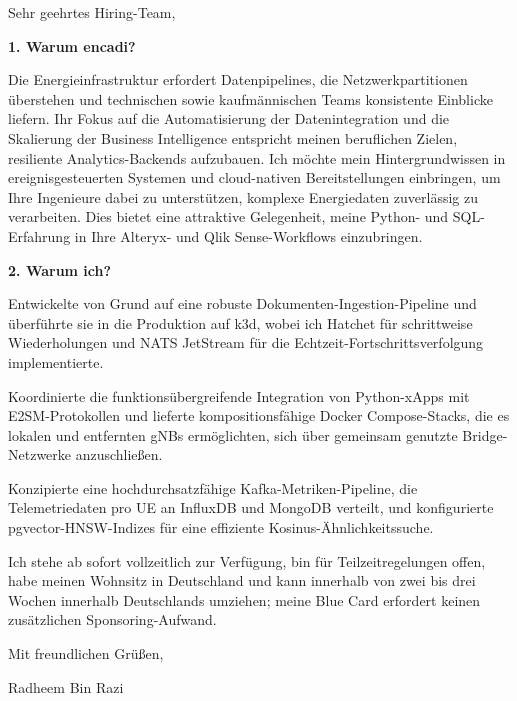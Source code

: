 \documentclass[11pt,a4paper]{coverletter}
\begin{document}
\opening{Sehr geehrtes Hiring-Team,}

\vspace{8pt}\noindent\textbf{1. Warum encadi?}\par\vspace{3pt}

Die Energieinfrastruktur erfordert Datenpipelines, die Netzwerkpartitionen überstehen und technischen sowie kaufmännischen Teams konsistente Einblicke liefern. Ihr Fokus auf die Automatisierung der Datenintegration und die Skalierung der Business Intelligence entspricht meinen beruflichen Zielen, resiliente Analytics-Backends aufzubauen. Ich möchte mein Hintergrundwissen in ereignisgesteuerten Systemen und cloud-nativen Bereitstellungen einbringen, um Ihre Ingenieure dabei zu unterstützen, komplexe Energiedaten zuverlässig zu verarbeiten. Dies bietet eine attraktive Gelegenheit, meine Python- und SQL-Erfahrung in Ihre Alteryx- und Qlik Sense-Workflows einzubringen.

\vspace{8pt}\noindent\textbf{2. Warum ich?}\par\vspace{3pt}

\bullets

  \item Entwickelte von Grund auf eine robuste Dokumenten-Ingestion-Pipeline und überführte sie in die Produktion auf k3d, wobei ich Hatchet für schrittweise Wiederholungen und NATS JetStream für die Echtzeit-Fortschrittsverfolgung implementierte.

  \item Koordinierte die funktionsübergreifende Integration von Python-xApps mit E2SM-Protokollen und lieferte kompositionsfähige Docker Compose-Stacks, die es lokalen und entfernten gNBs ermöglichten, sich über gemeinsam genutzte Bridge-Netzwerke anzuschließen.

  \item Konzipierte eine hochdurchsatzfähige Kafka-Metriken-Pipeline, die Telemetriedaten pro UE an InfluxDB und MongoDB verteilt, und konfigurierte pgvector-HNSW-Indizes für eine effiziente Kosinus-Ähnlichkeitssuche.

\bulletsend

Ich stehe ab sofort vollzeitlich zur Verfügung, bin für Teilzeitregelungen offen, habe meinen Wohnsitz in Deutschland und kann innerhalb von zwei bis drei Wochen innerhalb Deutschlands umziehen; meine Blue Card erfordert keinen zusätzlichen Sponsoring-Aufwand.

\closing{Mit freundlichen Grüßen,}{Radheem Bin Razi}
\end{document}
